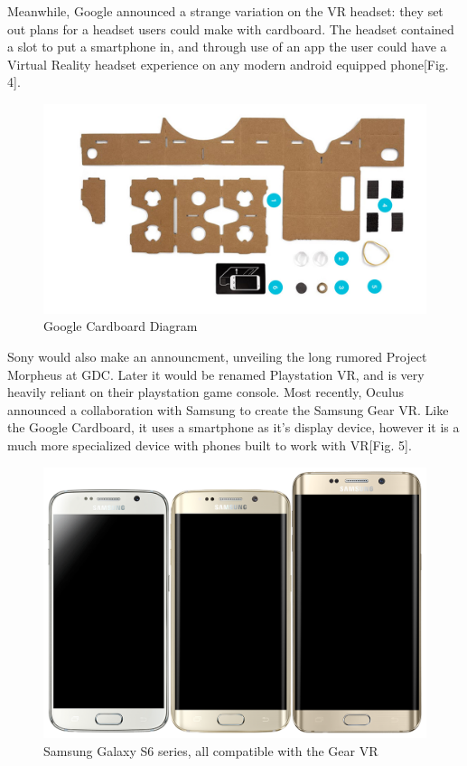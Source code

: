 \documentclass[a4paper,10pt]{article}
\begin{document}
Meanwhile, Google announced a strange variation on the VR headset:  they set out plans for a headset users could make with cardboard.  The headset contained a slot to put a smartphone in, and through use of an app the user could have a Virtual Reality headset experience on any modern android equipped phone[Fig. 4].
\begin{figure}[H]
	\centerline{\includegraphics[scale=0.4,angle = 90,keepaspectratio]{cardboard.jpg}}
	\caption{Google Cardboard Diagram}
	\label{fig:cardboard}
\end{figure}
Sony would also make an announcment, unveiling the long rumored Project Morpheus at GDC.  Later it would be renamed Playstation VR, and is very heavily reliant on their playstation game console.  Most recently, Oculus announced a collaboration with Samsung to create the Samsung Gear VR.  Like the Google Cardboard, it uses a smartphone as it's display device, however it is a much more specialized device with phones built to work with VR[Fig. 5].

\begin{figure}[H]
	\centerline{\includegraphics[width=\linewidth,height=\paperheight,keepaspectratio]{galaxy5.png}}
	\caption{Samsung Galaxy S6 series, all compatible with the Gear VR}
	\label{fig:samsungGalaxy}
\end{figure}
\end{document}
